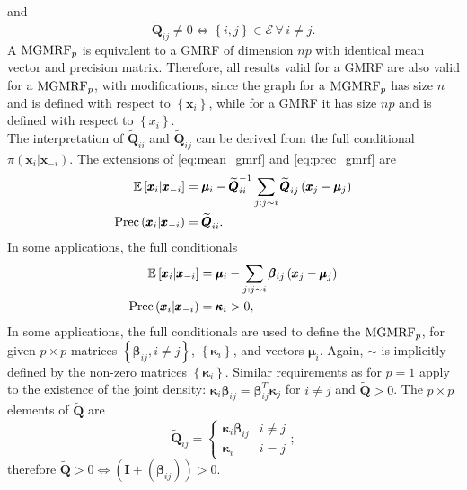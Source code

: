 \documentclass[12pt]{book}
\begin{document}
and
\begin{equation*}
    \widetilde{\pmb{Q}}_{ij}\neq0\Longleftrightarrow\left\lbrace i,j\right\rbrace\in\mathcal{E}\,\forall\,i\neq j.
\end{equation*}
A $\hbox{MGMRF}_p$ is equivalent to a GMRF of dimension $np$ with identical mean vector and precision matrix.  Therefore, all results valid for a GMRF are also valid for a $\hbox{MGMRF}_p$, with modifications, since the graph for a $\hbox{MGMRF}_p$ has size $n$ and is defined with respect to $\left\lbrace\pmb{x}_i\right\rbrace$, while for a GMRF it has size $np$ and is defined with respect to $\left\lbrace x_i\right\rbrace$.  \\
The interpretation of $\widetilde{\pmb{Q}}_{ii}$ and $\widetilde{\pmb{Q}}_{ij}$ can be derived from the full conditional $\pi\left(\pmb{x}_i|\pmb{x}_{-i}\right)$. The extensions of \eqref{eq:mean_gmrf} and \eqref{eq:prec_gmrf} are
\begin{align}
    \mathbb{E}\left[\pmb{x}_i|\pmb{x}_{-i}\right]&=\pmb{\mu}_i-\widetilde{\pmb{Q}}_{ii}^{-1}\sum_{j:j\sim i}\widetilde{\pmb{Q}}_{ij}\left(\pmb{x}_j-\pmb{\mu}_j\right)\\
    \hbox{Prec}\left(\pmb{x}_i|\pmb{x}_{-i}\right) &= \widetilde{\pmb{Q}}_{ii}.
\end{align}
In some applications, the full conditionals
\begin{align}
    \mathbb{E}\left[\pmb{x}_i|\pmb{x}_{-i}\right] &= \pmb{\mu}_i-\sum_{j:j\sim i}\pmb{\beta}_{ij}\left(\pmb{x}_j-\pmb{\mu}_j\right) \\
    \hbox{Prec}\left(\pmb{x}_i|\pmb{x}_{-i}\right) &= \pmb{\kappa}_i > 0,
\end{align}
In some applications, the full conditionals are used to define the $\hbox{MGMRF}_p$, for given $p\times p$-matrices $\left\lbrace\pmb{\beta}_{ij},i\neq j\right\rbrace$, $\left\lbrace\pmb{\kappa}_i\right\rbrace$, and vectors $\pmb{\mu}_i$. Again, $\sim$ is implicitly defined by the non-zero matrices $\left\lbrace\pmb{\kappa}_i\right\rbrace$. Similar requirements as for $p=1$ apply to the existence of the joint density: $\pmb{\kappa}_i\pmb{\beta}_{ij}=\pmb{\beta}_{ij}^T\pmb{\kappa}_j$ for $i\neq j$ and $\widetilde{\pmb{Q}} > 0$. The $p\times p$ elements of $\widetilde{\pmb{Q}}$ are
\begin{equation*}
    \widetilde{\pmb{Q}}_{ij}=\begin{cases}
    \pmb{\kappa}_i\pmb{\beta}_{ij} & i\neq j \\
    \pmb{\kappa}_i & i=j
    \end{cases};
\end{equation*}
therefore $\widetilde{\pmb{Q}}>0\Longleftrightarrow\left(\pmb{I}+\left(\pmb{\beta}_{ij}\right)\right) > 0$\autocite[Cf.][]{rue2005gaussian}.
\end{document}
